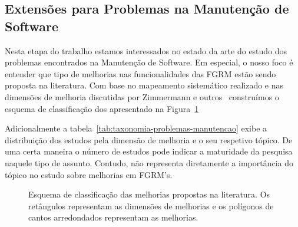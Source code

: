 \subsection{Extensões para Problemas na Manutenção de Software}
\label{sub:extensões_para_problemas_na_manutenção_de_software}

Nesta etapa do trabalho estamos interessados no estado da arte do estudo dos
problemas encontrados na Manutenção de Software. Em especial, o nosso foco é
entender que tipo de melhorias nas funcionalidades das FGRM estão sendo proposta
na literatura. Com base no mapeamento sistemático realizado e nas dimensões de
melhoria discutidas por Zimmermann e outros~\cite{5070993} construímos o esquema
de classificação dos apresentado na
Figura~\ref{fig:diagrama-esquema-dimensao-melhorias}

Adicionalmente a tabela~\ref{tab:taxonomia-problemas-manutencao} exibe a
distribuição dos estudos pela dimensão de melhoria e o seu respetivo tópico. De
uma certa maneira o número de estudos  pode indicar a maturidade da pesquisa
naquele tipo de assunto. Contudo, não representa diretamente a importância do
tópico no estudo sobre melhorias em FGRM's.



\begin{figure}[tb]
\centering
\caption{Esquema de classificação das melhorias propostas na literatura. Os
	retângulos representam as dimensões de melhorias e os polígonos de cantos
	arredondados representam as melhorias.}
\label{fig:diagrama-esquema-dimensao-melhorias}
\end{figure}

